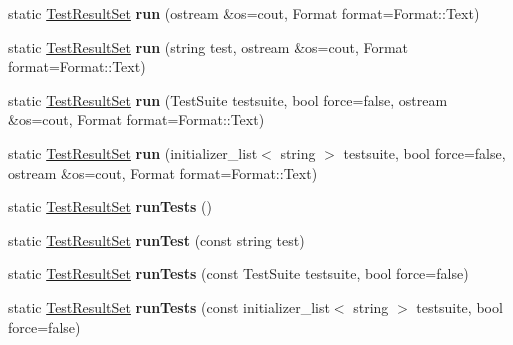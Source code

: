 \begin{DoxyCompactItemize}
\item 
\hypertarget{class_l_test_a4f52d3983d45fdf50b894d93dda47103}{static \hyperlink{class_result_set_3_01_test_result_01_4}{Test\-Result\-Set} {\bfseries run} (ostream \&os=cout, Format format=Format\-::\-Text)}\label{class_l_test_a4f52d3983d45fdf50b894d93dda47103}

\item 
\hypertarget{class_l_test_af5ec70e5b133ed164361bcbd762304af}{static \hyperlink{class_result_set_3_01_test_result_01_4}{Test\-Result\-Set} {\bfseries run} (string test, ostream \&os=cout, Format format=Format\-::\-Text)}\label{class_l_test_af5ec70e5b133ed164361bcbd762304af}

\item 
\hypertarget{class_l_test_af56f2634bad28fcc4a399f81b876be59}{static \hyperlink{class_result_set_3_01_test_result_01_4}{Test\-Result\-Set} {\bfseries run} (Test\-Suite testsuite, bool force=false, ostream \&os=cout, Format format=Format\-::\-Text)}\label{class_l_test_af56f2634bad28fcc4a399f81b876be59}

\item 
\hypertarget{class_l_test_a6a6e0418e3ed156520a17549751c5509}{static \hyperlink{class_result_set_3_01_test_result_01_4}{Test\-Result\-Set} {\bfseries run} (initializer\-\_\-list$<$ string $>$ testsuite, bool force=false, ostream \&os=cout, Format format=Format\-::\-Text)}\label{class_l_test_a6a6e0418e3ed156520a17549751c5509}

\item 
\hypertarget{class_l_test_a7bf26591cd39583798a7487ff23354da}{static \hyperlink{class_result_set_3_01_test_result_01_4}{Test\-Result\-Set} {\bfseries run\-Tests} ()}\label{class_l_test_a7bf26591cd39583798a7487ff23354da}

\item 
\hypertarget{class_l_test_a043d44ec3a57f7362b51d5a9fece6b8a}{static \hyperlink{class_result_set_3_01_test_result_01_4}{Test\-Result\-Set} {\bfseries run\-Test} (const string test)}\label{class_l_test_a043d44ec3a57f7362b51d5a9fece6b8a}

\item 
\hypertarget{class_l_test_af3c0b93f3d60414ad076a0f13ba7c25d}{static \hyperlink{class_result_set_3_01_test_result_01_4}{Test\-Result\-Set} {\bfseries run\-Tests} (const Test\-Suite testsuite, bool force=false)}\label{class_l_test_af3c0b93f3d60414ad076a0f13ba7c25d}

\item 
\hypertarget{class_l_test_a1e79801b21e86d71043e0707a4cbd002}{static \hyperlink{class_result_set_3_01_test_result_01_4}{Test\-Result\-Set} {\bfseries run\-Tests} (const initializer\-\_\-list$<$ string $>$ testsuite, bool force=false)}\label{class_l_test_a1e79801b21e86d71043e0707a4cbd002}


\end{DoxyCompactItemize}
